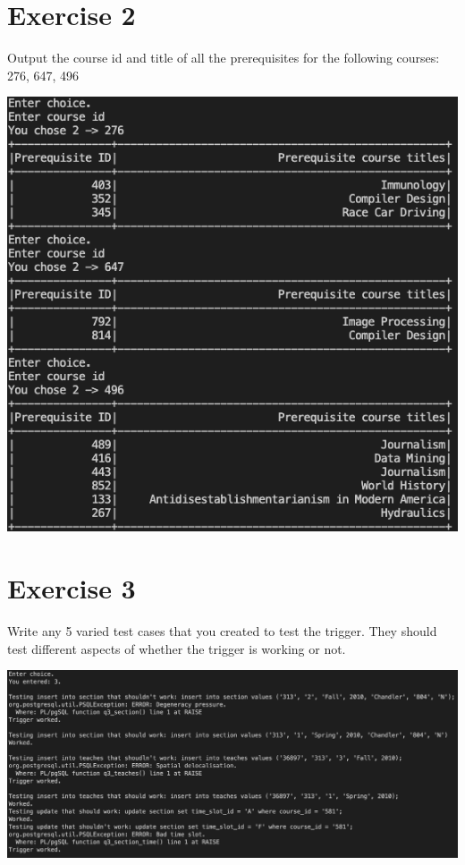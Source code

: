 \documentclass[12pt]{amsart}
\begin{document}
    
    
    
    \section*{Exercise 2}

    Output the course id and title of all the prerequisites for the following courses: 276, 647, 496

        \includegraphics[scale = 0.5]{2.png}

    \section*{Exercise 3}

    Write any 5 varied test cases that you created to test the trigger. They should test different aspects of whether the trigger is working or not.

        \includegraphics[scale = 0.35]{3.png}
\end{document}
